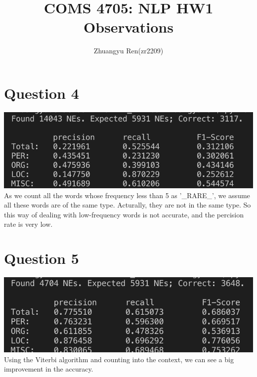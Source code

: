 \documentclass[12pt]{article}
\begin{document}
 
 
 
\title{COMS 4705: NLP HW1 Observations}%
%
\author{Zhuangyu Ren(zr2209)\\ %
} %
 
\maketitle
 \indent 
\section*{Question 4}
\includegraphics[scale=0.6]{42.png}\\
As we count all the words whose frequency less than 5 as '\_RARE\_', we assume all these words are of the same type. Acturally, they are not in the same type. So this way of dealing with low-frequency words is not accurate, and the percision rate is very low.\\



\section*{Question 5}
\includegraphics[scale=0.6]{52.png}\\
Using the Viterbi algorithm and counting into the context, we can see a big improvement in the accuracy.
\end{document}
